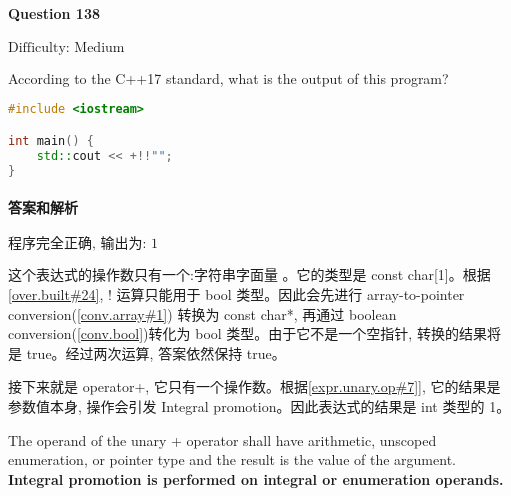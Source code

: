 \documentclass{article}
\begin{document}
	
	\paragraph*{Question 138} $\boxed{\text{Difficulty: Medium}} $			
	
	According to the C++17 standard, what is the output of this program?
	
	\begin{lstlisting}[language=C++]  		
#include <iostream>

int main() {
	std::cout << +!!"";
}
	\end{lstlisting}
	
	
	\paragraph*{答案和解析} $\boxed{\text{程序完全正确, 输出为: 1}} $
	
	这个表达式的操作数只有一个:字符串字面量 。它的类型是 const char[1]。根据 \href{https://timsong-cpp.github.io/cppwp/n4659/over.built#24}{[over.built\#24]}, ! 运算只能用于 bool 类型。因此会先进行 array-to-pointer conversion(\href{https://timsong-cpp.github.io/cppwp/n4659/conv.array#1}{[conv.array\#1]}) 转换为 const char*, 再通过 boolean conversion(\href{https://timsong-cpp.github.io/cppwp/n4659/conv.bool}{[conv.bool]})转化为 bool 类型。由于它不是一个空指针, 转换的结果将是 true。经过两次运算, 答案依然保持 true。
	
	接下来就是 operator+, 它只有一个操作数。根据\href{https://timsong-cpp.github.io/cppwp/n4659/expr.unary.op#7}{[expr.unary.op\#7]]}, 它的结果是参数值本身, 操作会引发 Integral promotion。因此表达式的结果是 int 类型的 1。
	
	\begin{lightgrayleftbar}
		The operand of the unary + operator shall have arithmetic, unscoped enumeration, or pointer type and the result is the value of the argument. \textbf{Integral promotion is performed on integral or enumeration operands.} 
	\end{lightgrayleftbar}
	
\end{document}
